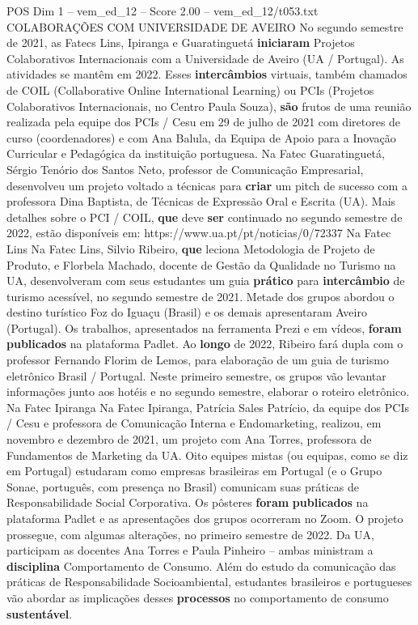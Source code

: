 \begin{textsample}{POS Dim 1 – vem\_ed\_12 – Score 2.00 – vem\_ed\_12/t053.txt}  \label{ex:f1_pos_189}
COLABORAÇÕES COM UNIVERSIDADE DE AVEIRO No segundo semestre de 2021, as Fatecs Lins, Ipiranga e Guaratinguetá \textbf{iniciaram} Projetos Colaborativos Internacionais com a Universidade de Aveiro (UA / Portugal).
As atividades se mantêm em 2022.
Esses \textbf{intercâmbios} virtuais, também chamados de COIL (Collaborative Online International Learning) ou PCIs (Projetos Colaborativos Internacionais, no Centro Paula Souza), \textbf{são} frutos de uma reunião realizada pela equipe dos PCIs / Cesu em 29 de julho de 2021 com diretores de curso (coordenadores) e com Ana Balula, da Equipa de Apoio para a Inovação Curricular e Pedagógica da instituição portuguesa.
Na Fatec Guaratinguetá, Sérgio Tenório dos Santos Neto, professor de Comunicação Empresarial, desenvolveu um projeto voltado a técnicas para \textbf{criar} um pitch de sucesso com a professora Dina Baptista, de Técnicas de Expressão Oral e Escrita (UA).
Mais detalhes sobre o PCI / COIL, \textbf{que} deve \textbf{ser} continuado no segundo semestre de 2022, estão disponíveis em: https://www.ua.pt/pt/noticias/0/72337 Na Fatec Lins Na Fatec Lins, Silvio Ribeiro, \textbf{que} leciona Metodologia de Projeto de Produto, e Florbela Machado, docente de Gestão da Qualidade no Turismo na UA, desenvolveram com seus estudantes um guia \textbf{prático} para \textbf{intercâmbio} de turismo acessível, no segundo semestre de 2021.
Metade dos grupos abordou o destino turístico Foz do Iguaçu (Brasil) e os demais apresentaram Aveiro (Portugal).
Os trabalhos, apresentados na ferramenta Prezi e em vídeos, \textbf{foram} \textbf{publicados} na plataforma Padlet.
Ao \textbf{longo} de 2022, Ribeiro fará dupla com o professor Fernando Florim de Lemos, para elaboração de um guia de turismo eletrônico Brasil / Portugal.
Neste primeiro semestre, os grupos vão levantar informações junto aos hotéis e no segundo semestre, elaborar o roteiro eletrônico.
Na Fatec Ipiranga Na Fatec Ipiranga, Patrícia Sales Patrício, da equipe dos PCIs / Cesu e professora de Comunicação Interna e Endomarketing, realizou, em novembro e dezembro de 2021, um projeto com Ana Torres, professora de Fundamentos de Marketing da UA.
Oito equipes mistas (ou equipas, como se diz em Portugal) estudaram como empresas brasileiras em Portugal (e o Grupo Sonae, português, com presença no Brasil) comunicam suas práticas de Responsabilidade Social Corporativa.
Os pôsteres \textbf{foram} \textbf{publicados} na plataforma Padlet e as apresentações dos grupos ocorreram no Zoom.
O projeto prossegue, com algumas alterações, no primeiro semestre de 2022.
Da UA, participam as docentes Ana Torres e Paula Pinheiro – ambas ministram a \textbf{disciplina} Comportamento de Consumo.
Além do estudo da comunicação das práticas de Responsabilidade Socioambiental, estudantes brasileiros e portugueses vão abordar as implicações desses \textbf{processos} no comportamento de consumo \textbf{sustentável}.

\end{textsample}
